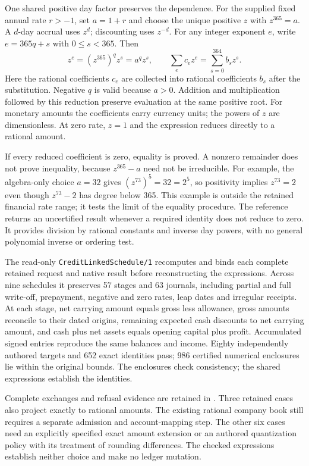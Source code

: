 One shared positive day factor preserves the dependence. For the supplied
fixed annual rate $r>-1$, set $a=1+r$ and choose the unique positive $z$ with
$z^{365}=a$. A $d$-day accrual uses $z^d$; discounting uses $z^{-d}$. For any
integer exponent $e$, write $e=365q+s$ with $0\leq s<365$. Then
\[
 z^e=(z^{365})^qz^s=a^qz^s,
 \qquad
 \sum_e c_ez^e=\sum_{s=0}^{364}b_sz^s .
\]
Here the rational coefficients $c_e$ are collected into rational coefficients
$b_s$ after the substitution. Negative $q$ is valid because $a>0$. Addition
and multiplication followed by this reduction preserve evaluation at the
same positive root. For monetary amounts the coefficients carry currency
units; the powers of $z$ are dimensionless. At zero rate, $z=1$ and the
expression reduces directly to a rational amount.

If every reduced coefficient is zero, equality is proved. A nonzero remainder
does not prove inequality, because $z^{365}-a$ need not be irreducible. For
example, the algebra-only choice $a=32$ gives $(z^{73})^5=32=2^5$, so positivity
implies $z^{73}=2$ even though $z^{73}-2$ has degree below 365. This example is
outside the retained financial rate range; it tests the limit of the equality
procedure. The reference returns an uncertified result whenever a required
identity does not reduce to zero. It provides division by rational constants
and inverse day powers, with no general polynomial inverse or ordering test.

The read-only \texttt{CreditLinkedSchedule/1} recomputes and binds each complete
retained request and native result before reconstructing the expressions.
Across nine schedules it preserves 57 stages and 63 journals, including
partial and full write-off, prepayment, negative and zero rates, leap dates
and irregular receipts. At each stage, net carrying amount equals gross less
allowance, gross amounts reconcile to their dated origins, remaining expected
cash discounts to net carrying amount, and cash plus net assets equals opening
capital plus profit. Accumulated signed entries reproduce the same balances
and income. Eighty independently authored targets and 652 exact identities
pass; 986 certified numerical enclosures lie within the original bounds. The
enclosures check consistency; the shared expressions establish the identities.

Complete exchanges and refusal evidence are retained in
. Three
retained cases also project exactly to rational amounts. The existing rational
company book still requires a separate admission and account-mapping step.
The other six cases need an explicitly specified exact amount extension or
an authored quantization policy with its treatment of rounding differences.
The checked expressions establish neither choice and make no ledger mutation.


